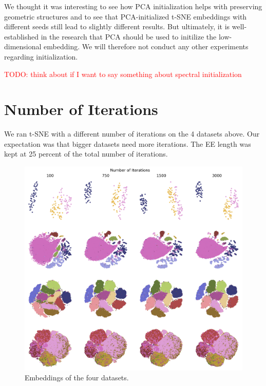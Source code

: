 We thought it was interesting to see how PCA initialization helps with preserving geometric structures and to see that PCA-initialized t-SNE embeddings with different seeds still lead to slightly different results. 
But ultimately, it is well-established in the research that PCA should be used to initilize the low-dimensional embedding. 
We will therefore not conduct any other experiments regarding initialization. 

\textcolor{red}{TODO: think about if I want to say something about spectral initialization}

\section{Number of Iterations}
We ran t-SNE with a different number of iterations on the 4 datasets above. Our expectation was that bigger datasets need more iterations. The EE length was kept at 25 percent of the total number of iterations. 

\begin{figure}[h]
    \centering 
        \includegraphics[width=\linewidth]{figures/n_iter/n_iter_embedding_grid_tab20b.png}
        \caption{Embeddings of the four datasets.}
    \label{fig:n_iter-grid}
\end{figure}

